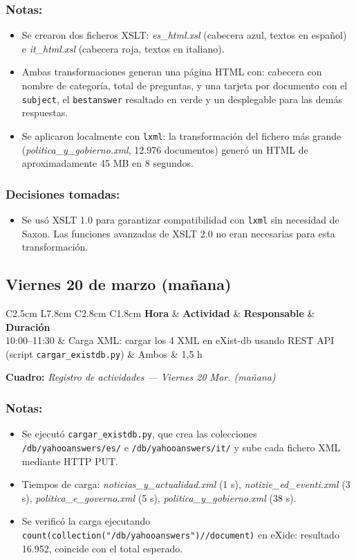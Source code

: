 \documentclass[11pt,a4paper]{article}
\newcommand{\notetitle}[1]{\subsubsection*{#1}}
\newcommand{\activitytable}[2]{%
  \begin{center}
  \begin{tabular}{C{2.5cm} L{7.8cm} C{2.8cm} C{1.8cm}}
  \toprule
  \rowcolor{white}
  \textbf{Hora} & \textbf{Actividad} & \textbf{Responsable} & \textbf{Duración} \\
  \midrule
  #1
  \bottomrule
  \end{tabular}
  \end{center}
  \vspace{-4pt}
  {\small\textbf{Cuadro:} \textit{#2}}
  \vspace{6pt}
}
\begin{document}
\notetitle{Notas:}
\begin{itemize}
  \item Se crearon dos ficheros XSLT: \textit{es\_html.xsl} (cabecera azul, textos en español) e \textit{it\_html.xsl} (cabecera roja, textos en italiano).
  \item Ambas transformaciones generan una página HTML con: cabecera con nombre de categoría, total de preguntas, y una tarjeta por documento con el \texttt{subject}, el \texttt{bestanswer} resaltado en verde y un desplegable para las demás respuestas.
  \item Se aplicaron localmente con \texttt{lxml}: la transformación del fichero más grande (\textit{politica\_y\_gobierno.xml}, 12.976 documentos) generó un HTML de aproximadamente 45 MB en 8 segundos.
\end{itemize}

\notetitle{Decisiones tomadas:}
\begin{itemize}
  \item Se usó XSLT 1.0 para garantizar compatibilidad con \texttt{lxml} sin necesidad de Saxon. Las funciones avanzadas de XSLT 2.0 no eran necesarias para esta transformación.
\end{itemize}

\subsection{Viernes 20 de marzo (mañana)}

\activitytable{%
  10:00--11:30 & Carga XML: cargar los 4 XML en eXist-db usando REST API (script \texttt{cargar\_existdb.py}) & Ambos & 1,5 h \\
}{Registro de actividades --- Viernes 20 Mar. (mañana)}

\notetitle{Notas:}
\begin{itemize}
  \item Se ejecutó \texttt{cargar\_existdb.py}, que crea las colecciones \texttt{/db/yahooanswers/es/} e \texttt{/db/yahooanswers/it/} y sube cada fichero XML mediante HTTP PUT.
  \item Tiempos de carga: \textit{noticias\_y\_actualidad.xml} (1 s), \textit{notizie\_ed\_eventi.xml} (3 s), \textit{politica\_e\_governo.xml} (5 s), \textit{politica\_y\_gobierno.xml} (38 s).
  \item Se verificó la carga ejecutando \texttt{count(collection("/db/yahooanswers")//document)} en eXide: resultado 16.952, coincide con el total esperado.
\end{itemize}
\end{document}
